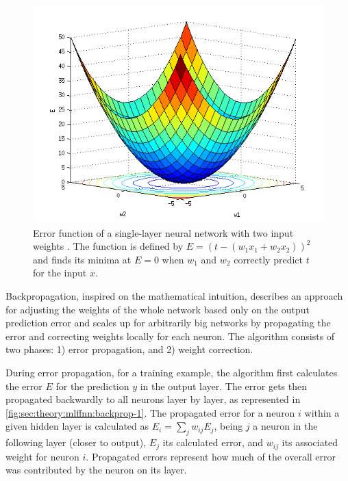 \begin{figure}[t]
  \includegraphics[width=\textwidth]{gfx/error-function}
  \caption{
    Error function of a single-layer neural network with two input weights \cite{AI4562013}.
    The function is defined by $E = (t - (w_1 x_1 + w_2 x_2))^2$ and finds its minima at $E = 0$ when $w_1$ and $w_2$ correctly predict $t$ for the input $x$.
  }
  \label{fig:sec:theory:mlffnn:error-function}
\end{figure}

Backpropagation, inspired on the mathematical intuition, describes an approach for adjusting the weights of the whole network based only on the output prediction error and scales up for arbitrarily big networks by propagating the error and correcting weights locally for each neuron.
The algorithm consists of two phases: 1) error propagation, and 2) weight correction.

During error propagation, for a training example, the algorithm first calculates the error $E$ for the prediction $y$ in the output layer.
The error gets then propagated backwardly to all neurons layer by layer, as represented in \autoref{fig:sec:theory:mlffnn:backprop-1}.
The propagated error for a neuron $i$ within a given hidden layer is calculated as $E_{i} = \sum_j w_{ij} E_{j}$, being $j$ a neuron in the following layer (closer to output), $E_{j}$ its calculated error, and $w_{ij}$ its associated weight for neuron $i$.
Propagated errors represent how much of the overall error was contributed by the neuron on its layer.

